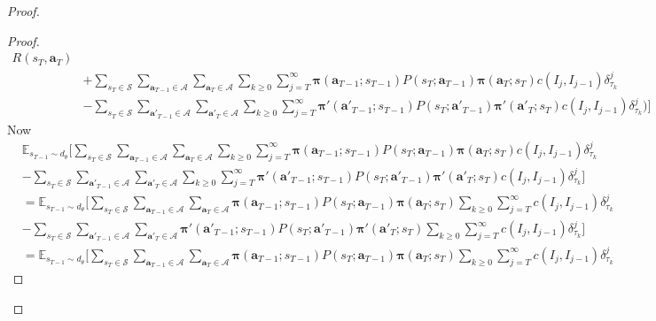 \documentclass{article}
\begin{document}
\begin{proof}
\begin{proof}
\begin{align}
R(s_{T},\boldsymbol{a}_{T})
\\&+\sum_{s_T\in\mathcal{S}}\sum_{\boldsymbol{a}_{T-1}\in\boldsymbol{\mathcal{A}}}\sum_{\boldsymbol{a}_{T}\in\boldsymbol{\mathcal{A}}}\sum_{k\geq 0}\sum_{j= T}^\infty\boldsymbol{\pi}(\boldsymbol{a}_{T-1};s_{T-1})P(s_T;\boldsymbol{a}_{T-1})\boldsymbol{\pi}(\boldsymbol{a}_{T};s_{T}) c(I_j,I_{j-1})\delta^j_{\tau_k}
\\&-\sum_{s_T\in\mathcal{S}}\sum_{\boldsymbol{a'}_{T-1}\in\boldsymbol{\mathcal{A}}}\sum_{\boldsymbol{a'}_{T}\in\boldsymbol{\mathcal{A}}}\sum_{k\geq 0}\sum_{j= T}^\infty\boldsymbol{\pi'}(\boldsymbol{a'}_{T-1};s_{T-1})P(s_T;\boldsymbol{a'}_{T-1})\boldsymbol{\pi'}(\boldsymbol{a'}_{T};s_{T}) c(I_j,I_{j-1})\delta^j_{\tau_k}\Bigg)\Bigg]
\end{align}
Now
\begin{align}\nonumber
&\mathbb{E}_{s_{T-1}\sim d_\theta}\Bigg[\sum_{s_T\in\mathcal{S}}\sum_{\boldsymbol{a}_{T-1}\in\boldsymbol{\mathcal{A}}}\sum_{\boldsymbol{a}_{T}\in\boldsymbol{\mathcal{A}}}\sum_{k\geq 0}\sum_{j= T}^\infty\boldsymbol{\pi}(\boldsymbol{a}_{T-1};s_{T-1})P(s_T;\boldsymbol{a}_{T-1})\boldsymbol{\pi}(\boldsymbol{a}_{T};s_{T}) c(I_j,I_{j-1})\delta^j_{\tau_k}
\\&-\sum_{s_T\in\mathcal{S}}\sum_{\boldsymbol{a'}_{T-1}\in\boldsymbol{\mathcal{A}}}\sum_{\boldsymbol{a'}_{T}\in\boldsymbol{\mathcal{A}}}\sum_{k\geq 0}\sum_{j= T}^\infty\boldsymbol{\pi'}(\boldsymbol{a'}_{T-1};s_{T-1})P(s_T;\boldsymbol{a'}_{T-1})\boldsymbol{\pi'}(\boldsymbol{a'}_{T};s_{T}) c(I_j,I_{j-1})\delta^j_{\tau_k}\Bigg]\nonumber
\\&=\mathbb{E}_{s_{T-1}\sim d_\theta}\Bigg[\sum_{s_T\in\mathcal{S}}\sum_{\boldsymbol{a}_{T-1}\in\boldsymbol{\mathcal{A}}}\sum_{\boldsymbol{a}_{T}\in\boldsymbol{\mathcal{A}}}\boldsymbol{\pi}(\boldsymbol{a}_{T-1};s_{T-1})P(s_T;\boldsymbol{a}_{T-1})\boldsymbol{\pi}(\boldsymbol{a}_{T};s_{T}) \sum_{k\geq 0}\sum_{j= T}^\infty c(I_j,I_{j-1})\delta^j_{\tau_k}
\\&-\sum_{s_T\in\mathcal{S}}\sum_{\boldsymbol{a'}_{T-1}\in\boldsymbol{\mathcal{A}}}\sum_{\boldsymbol{a'}_{T}\in\boldsymbol{\mathcal{A}}}\boldsymbol{\pi'}(\boldsymbol{a'}_{T-1};s_{T-1})P(s_T;\boldsymbol{a'}_{T-1})\boldsymbol{\pi'}(\boldsymbol{a'}_{T};s_{T})\sum_{k\geq 0}\sum_{j= T}^\infty c(I_j,I_{j-1})\delta^j_{\tau_k}\Bigg]
\\&=\mathbb{E}_{s_{T-1}\sim d_\theta}\Bigg[\sum_{s_T\in\mathcal{S}}\sum_{\boldsymbol{a}_{T-1}\in\boldsymbol{\mathcal{A}}}\sum_{\boldsymbol{a}_{T}\in\boldsymbol{\mathcal{A}}}\boldsymbol{\pi}(\boldsymbol{a}_{T-1};s_{T-1})P(s_T;\boldsymbol{a}_{T-1})\boldsymbol{\pi}(\boldsymbol{a}_{T};s_{T}) \sum_{k\geq 0}\sum_{j= T}^\infty c(I_j,I_{j-1})\delta^j_{\tau_k}

\end{align}
\end{proof}
\end{proof}
\end{document}
